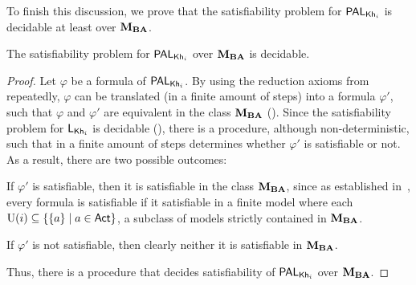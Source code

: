 
To finish this discussion, we prove that the satisfiability problem for $\mathsf{PAL}_{{\sf Kh}_i}$ is decidable at least over $\mathbf{M}_{\mathbf{BA}}$.

\medskip 

\begin{corollary}\label{cor:palsat}
The satisfiability problem for $\mathsf{PAL}_{{\sf Kh}_i}$ over $\mathbf{M}_{\mathbf{BA}}$ is decidable.
\end{corollary}
\begin{proof}
Let $\varphi$ be a formula of $\mathsf{PAL}_{{\sf Kh}_i}$. By using the reduction axioms from~ repeatedly, $\varphi$ can be translated (in a finite amount of steps) into a formula $\varphi'$, such that $\varphi$ and $\varphi'$ are equivalent in the class $\mathbf{M}_{\mathbf{BA}}$ (). 
Since the satisfiability problem for $\mathsf{L}_{{\sf Kh}_i}$ is decidable (\cite{AFSVQ21,AFSVQ23report}), there is a procedure, although non-deterministic, such that in a finite amount of steps determines whether $\varphi'$ is satisfiable or not.
As a result, there are two possible outcomes:
\begin{inlineenum}
\item If $\varphi'$ is satisfiable, then it is satisfiable in the class $\mathbf{M}_{\mathbf{BA}}$, since as established in~\cite{AFSVQ21,AFSVQ23report}, every formula is satisfiable if it satisfiable in a finite model where each $\operatorname{U}(i)\subseteq\{ \{ a \} \mid a\in{\rm \sf Act} \}$, a subclass of models strictly contained in $\mathbf{M}_{\mathbf{BA}}$.  
\item If $\varphi'$ is not satisfiable, then clearly neither it is satisfiable in $\mathbf{M}_{\mathbf{BA}}$. %
\end{inlineenum}
Thus, there is a procedure that decides satisfiability of $\mathsf{PAL}_{{\sf Kh}_i}$ over $\mathbf{M}_{\mathbf{BA}}$. 
\end{proof}
